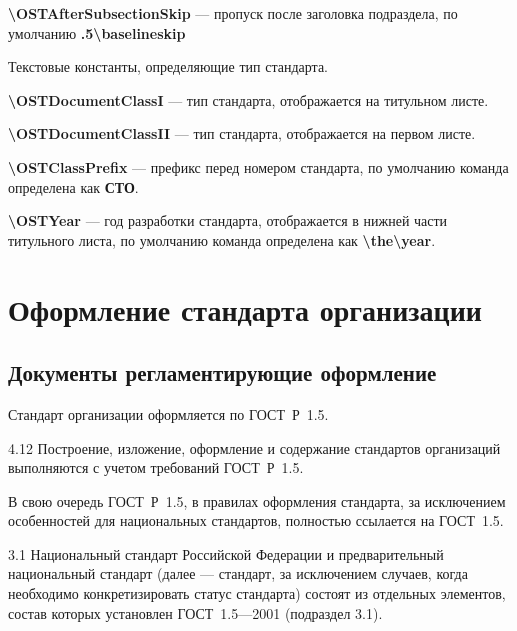 \documentclass[12pt, twoside, final]{ruost}
\newcommand{\txtcmd}[1]{\textbf{\textbackslash{}#1}}
\begin{document}
\begin{OST}
					\subpoint \txtcmd{OSTAfterSubsectionSkip} --- пропуск после заголовка подраздела, по умолчанию \textbf{.5\textbackslash{}baselineskip}

				
				\point Текстовые константы, определяющие тип стандарта.
				
					\subpoint \txtcmd{OSTDocumentClassI} --- тип стандарта, отображается на титульном листе.
					
					\subpoint \txtcmd{OSTDocumentClassII} --- тип стандарта, отображается на первом листе.
					
					\subpoint \txtcmd{OSTClassPrefix} --- префикс перед номером стандарта,  по умолчанию команда определена как \textbf{СТО}.
					
				\point  \txtcmd{OSTYear} --- год разработки стандарта, отображается в нижней части титульного листа,  по умолчанию команда определена как \txtcmd{the\textbackslash{}year}.
		
		\section{Оформление стандарта организации}
		
			\subsection{Документы регламентирующие оформление}
			
				\point Стандарт организации оформляется по ГОСТ~Р~1.5.
				
					\begin{stdquote}
						\par 4.12 Построение, изложение, оформление и содержание стандартов организаций выполняются с учетом требований ГОСТ~Р~1.5.
						\par [ГОСТ Р 1.4---2004]
					\end{stdquote}
				
				\point В свою очередь ГОСТ~Р~1.5, в правилах оформления стандарта, за исключением особенностей для национальных стандартов, полностью ссылается на ГОСТ~1.5.
				
					\begin{stdquote}
						\par 3.1 Национальный стандарт Российской Федерации и предварительный национальный стандарт (далее — стандарт, за исключением случаев, когда необходимо конкретизировать статус стандарта) состоят из отдельных элементов, состав которых установлен ГОСТ~1.5—2001 (подраздел 3.1).
						\par [ГОСТ Р 1.5---2012]
					\end{stdquote}
					

\end{OST}
\end{document}
